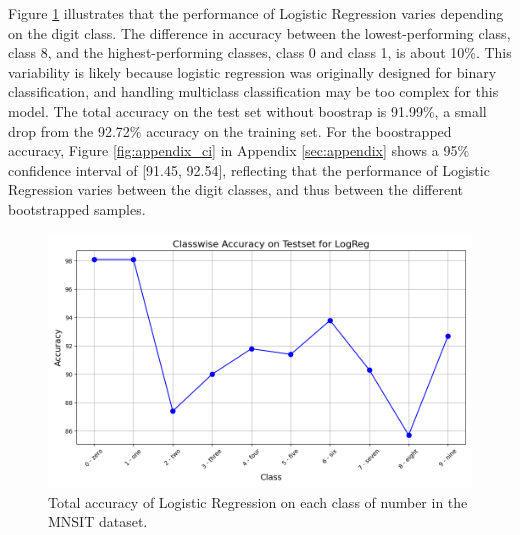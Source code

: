 Figure \ref{fig:ClasswiseAccuracyLogReg} illustrates that the performance of Logistic Regression varies depending on the digit class. The difference in accuracy between the lowest-performing class, class 8, and the highest-performing classes, class 0 and class 1, is about 10\%. This variability is likely because logistic regression was originally designed for binary classification, and handling multiclass classification may be too complex for this model. The total accuracy on the test set without boostrap is 91.99\%, a small drop from the 92.72\% accuracy on the training set. For the boostrapped accuracy, Figure \ref{fig:appendix_ci} in Appendix \ref{sec:appendix} shows a 95\% confidence interval of [91.45, 92.54], reflecting that the performance of Logistic Regression varies between the digit classes, and thus between the different bootstrapped samples.
\begin{figure}[H]
    \centering
    \includegraphics[width=\textwidth]{results/evaluation/LogReg_classwise_acc.png}
    \caption{Total accuracy of Logistic Regression on each class of number in the MNSIT dataset.}
    \label{fig:ClasswiseAccuracyLogReg}
\end{figure}

